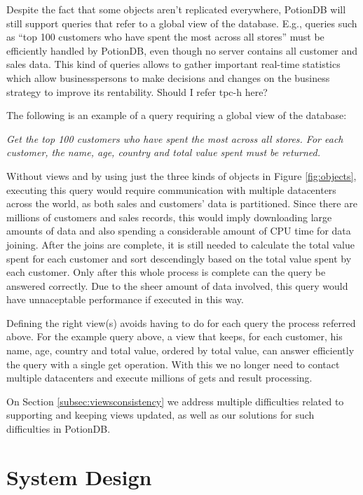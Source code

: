 \documentclass{vldb}
\newcommand{\grumbler}[2]{{\color{red}{\bf #1:} #2}}
\newcommand{\andre}[1]{\grumbler{andre}{#1}}
\newcommand{\emphvspace}{0.5\baselineskip}
\newcommand{\lineemph}[1]{\vspace{\emphvspace}\hspace{2em}\emph{#1}\vspace{\emphvspace}}
\begin{document}
Despite the fact that some objects aren't replicated everywhere, PotionDB will still support queries that refer to a global view of the database.
E.g., queries such as ``top 100 customers who have spent the most across all stores'' must be efficiently handled by PotionDB, even though no server contains all customer and sales data. 
This kind of queries allows to gather important real-time statistics which allow businesspersons to make decisions and changes on the business strategy to improve its rentability.
\andre{Should I refer tpc-h here?}

The following is an example of a query requiring a global view of the database:

\lineemph{Get the top 100 customers who have spent the most across all stores. For each customer, the name, age, country and total value spent must be returned.}

Without views and by using just the three kinds of objects in Figure \ref{fig:objects}, executing this query would require communication with multiple datacenters across the world, as both sales and customers' data is partitioned.
Since there are millions of customers and sales records, this would imply downloading large amounts of data and also spending a considerable amount of CPU time for data joining.
After the joins are complete, it is still needed to calculate the total value spent for each customer and sort descendingly based on the total value spent by each customer.
Only after this whole process is complete can the query be answered correctly.
Due to the sheer amount of data involved, this query would have unnaceptable performance if executed in this way.

Defining the right view(s) avoids having to do for each query the process referred above.
For the example query above, a view that keeps, for each customer, his name, age, country and total value, ordered by total value, can answer efficiently the query with a single get operation.
With this we no longer need to contact multiple datacenters and execute millions of gets and result processing.

On Section \ref{subsec:viewsconsistency} we address multiple difficulties related to supporting and keeping views updated, as well as our solutions for such difficulties in PotionDB.

\section{System Design}
\end{document}
